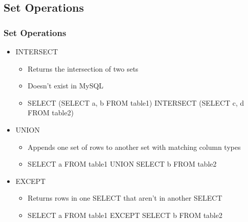 \documentclass{beamer}
\begin{document}
\subsection{Set Operations}
\begin{frame}
    \frametitle{Set Operations}
    \begin{itemize}
        \item INTERSECT
        \pause
        \begin{itemize}
            \item Returns the intersection of two sets
            \pause
            \item Doesn't exist in MySQL
            \pause
            \item SELECT (SELECT a, b FROM table1) INTERSECT (SELECT c, d FROM table2)
            \pause
        \end{itemize}
        \item UNION
        \pause
        \begin{itemize}
            \item Appends one set of rows to another set with matching column types
            \pause
            \item SELECT a FROM table1 UNION SELECT b FROM table2
            \pause
        \end{itemize}
        \item EXCEPT
        \pause
        \begin{itemize}
            \item Returns rows in one SELECT that aren't in another SELECT
            \pause
            \item SELECT a FROM table1 EXCEPT SELECT b FROM table2
        \end{itemize}
    \end{itemize}
\end{frame}
\end{document}
